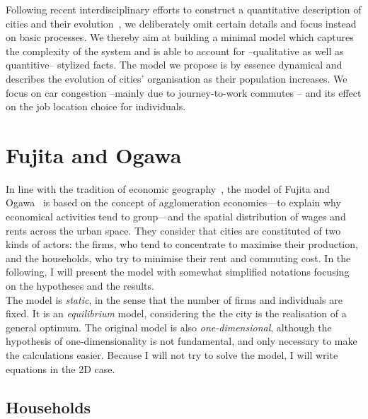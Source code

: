
Following recent interdisciplinary efforts to construct a quantitative
description of cities and their
evolution~\cite{Makse:1995,Zanette:1997,Marsili:1998a,Marsili:1998b,Batty:book2005,Bettencourt:2007,Batty:2008},
we deliberately omit certain details and focus instead on basic
processes. We thereby aim at building a minimal model which captures
the complexity of the system and is able to account for --qualitative as well as quantitive-- stylized
facts. The model we propose is by essence dynamical and describes the
evolution of cities' organisation as their population increases. We
focus on car congestion --mainly due to journey-to-work commutes --
and its effect on the job location choice for individuals.

\section{Fujita and Ogawa}
\label{sec:fujita_and_ogawa}

In line with the tradition of economic geography~\cite{Fujita:2001}, the model
of Fujita and Ogawa~\cite{Fujita:1982} is based on the concept of agglomeration
economies---to explain why economical activities tend to group---and the spatial
distribution of wages and rents across the urban space. They consider that
cities are constituted of two kinds of actors: the firms, who tend to
concentrate to maximise their production, and the households, who try to
minimise their rent and commuting cost. In the following, I will present the
model with somewhat simplified notations focusing on the hypotheses and the results.\\ 

The model is \emph{static}, in the sense that the number of firms and
individuals are fixed. It is an \emph{equilibrium} model, considering the the
city is the realisation of a general optimum. The original model is also
\emph{one-dimensional}, although the hypothesis of one-dimensionality is not
fundamental, and only necessary to make the calculations easier. Because I will
not try to solve the model, I will write equations in the 2D case.

\subsection{Households} 
\label{sub:households}

